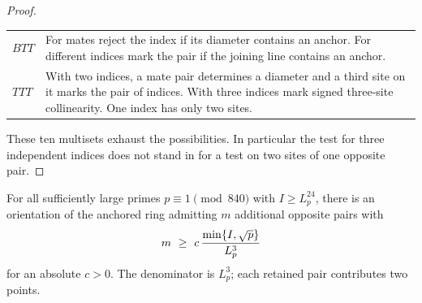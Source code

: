 \begin{proof}
\begin{center}
\begin{tabularx}{\linewidth}{@{}lX@{}}
$BTT$ & For mates reject the index if its diameter contains an anchor. For different indices mark the pair if the joining line contains an anchor.\\
$TTT$ & With two indices, a mate pair determines a diameter and a third site on it marks the pair of indices. With three indices mark signed three-site collinearity. One index has only two sites.\\ \bottomrule
\end{tabularx}\end{center}
These ten multisets exhaust the possibilities. In particular the test for three independent indices does not stand in for a test on two sites of one opposite pair.
\end{proof}

\begin{proposition}\label{prop:index} For all sufficiently large primes $p\equiv1\pmod{840}$ with $I\ge L_p^{24}$, there is an orientation of the anchored ring admitting $m$ additional opposite pairs with
\[
 \mathcopy{m >= c * min(I, sqrt(p)) / (L_p^3), for an absolute c > 0.}{m\ \ge\ c\,\frac{\min\{I,\sqrt p\}}{L_p^3}}
\]
for an absolute $c>0$. The denominator is $L_p^3$; each retained pair contributes two points.
\end{proposition}
